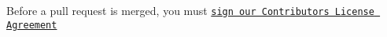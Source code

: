 Before a pull request is merged, you must \href{https://www.clahub.com/agreements/kubostech/KubOS}{\tt sign our Contributor\textquotesingle{}s License Agreement} 
